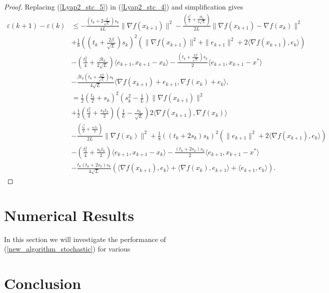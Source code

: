 \documentclass{article}
\theoremstyle{plain}
\theoremstyle{definition}
\theoremstyle{remark}
\begin{document}
\begin{proof}
        Replacing (\ref{Lyap2_stc_5}) in (\ref{Lyap2_stc_4}) and simplification gives
        \begin{align}\label{Lyap2_stc_6}
            \varepsilon(k+1)-\varepsilon(k)&\leq -\frac{(t_k+2\frac{\beta}{\sqrt{L}})s_k}{4L} \|\nabla f(x_{k+1})\|^2-\frac{(\frac{t_{k}^2}{4}+\frac{\beta t_{k}}{2\sqrt{L}})}{2L}\|\nabla f(x_{k+1})-\nabla f(x_k)\|^2\nonumber\\
            &+\frac{1}{8}((t_k+\frac{2\beta}{\sqrt{L}})s_k)^2(\|\nabla f(x_{k+1})\|^2+\|e_{k+1}\|^2+2\langle \nabla f(x_{k+1}) ,e_k \rangle) \nonumber\\
            & -(\frac{t_k^2}{4}+\frac{\beta t_k}{2\sqrt{L}})\langle e_{k+1},x_{k+1}-x_k\rangle-\frac{(t_k+\tfrac{2\beta}{\sqrt{L}})s_k}{2}\langle e_{k+1},x_{k+1}-x^*\rangle\nonumber\\
         & -\frac{\beta t_k(t_k+\frac{2\beta}{\sqrt{L}})s_k}{4\sqrt{L}}\langle \nabla f(x_{k+1})+e_{k+1}, \nabla f(x_k)+e_k \rangle,\nonumber\\
         &=\frac{1}{2}\left(\frac{t_k}{2}+s_k\right)^2(s_k^2-\frac{1}{L})\|\nabla f(x_{k+1})\|^2\nonumber\\
         &+\frac{1}{2}\left(\frac{t_k^2}{4}+\frac{s_kt_k}{2} \right)(\frac{1}{L}-\frac{s_k}{\sqrt{L}}) 2\langle \nabla f(x_{k+1}),\nabla f(x_k) \rangle\nonumber\\
         &-\frac{(\frac{t_{k}^2}{4}+\frac{s_{k}t_{k}}{2})}{2L}\|\nabla f(x_k)\|^2+\frac{1}{8}((t_k+2s_k)s_k)^2(\|e_{k+1}\|^2+2\langle \nabla f(x_{k+1}) ,e_k \rangle)\nonumber\\
         & -(\frac{t_k^2}{4}+\frac{s_kt_k}{2})\langle e_{k+1},x_{k+1}-x_k\rangle-\frac{(t_k+2s_k)s_k}{2}\langle e_{k+1},x_{k+1}-x^*\rangle\nonumber\\
         &-\frac{t_k(t_k+2s_k)s_k}{4\sqrt{L}}\left(\langle \nabla f(x_{k+1}),e_k \rangle+\langle \nabla f(x_{k}) , e_{k+1}\rangle+\langle e_{k+1},e_k\rangle\right).
        \end{align}

    
\end{proof}






\section{Numerical Results}\label{sec_numerical}
In this section we will investigate the performance of (\ref{new_algorithm_stochastic}) for various 
\section{Conclusion}\label{sec_conclusion}


\end{document}
